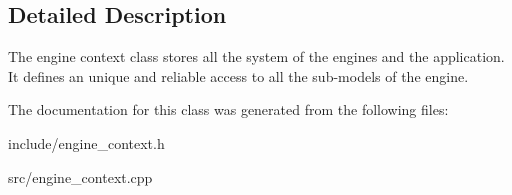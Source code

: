 \subsection{Detailed Description}
The engine context class stores all the system of the engines and the application. It defines an unique and reliable access to all the sub-\/models of the engine. 

The documentation for this class was generated from the following files\+:\begin{DoxyCompactItemize}
\item 
include/engine\+\_\+context.\+h\item 
src/engine\+\_\+context.\+cpp\end{DoxyCompactItemize}
